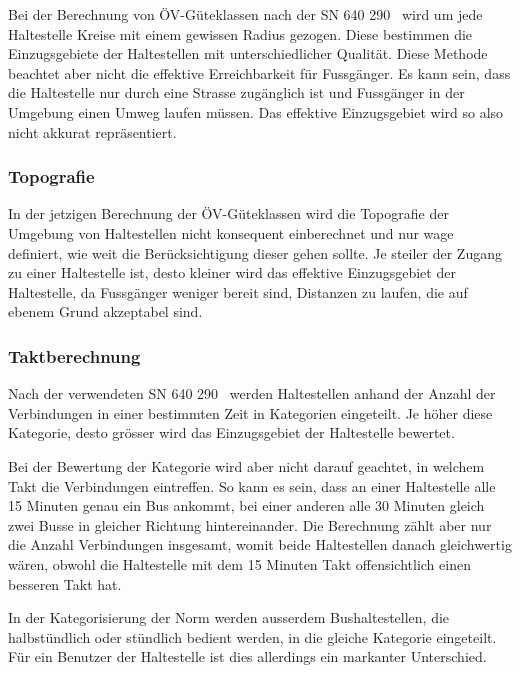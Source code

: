 Bei der Berechnung von \acs{ÖV}-Güteklassen nach der \acs{SN} 640 290~\cite{sn640290} wird um jede Haltestelle Kreise mit einem gewissen Radius gezogen.
Diese bestimmen die Einzugsgebiete der Haltestellen mit unterschiedlicher Qualität.
Diese Methode beachtet aber nicht die effektive Erreichbarkeit für Fussgänger.
Es kann sein, dass die Haltestelle nur durch eine Strasse zugänglich ist und Fussgänger in der Umgebung einen Umweg laufen müssen.
Das effektive Einzugsgebiet wird so also nicht akkurat repräsentiert.

\subsubsection{Topografie}
\label{Problemstellung:Topografie}

In der jetzigen Berechnung der \acs{ÖV}-Güteklassen wird die Topografie der Umgebung von Haltestellen nicht konsequent einberechnet und nur wage definiert, wie weit die Berücksichtigung dieser gehen sollte.
Je steiler der Zugang zu einer Haltestelle ist, desto kleiner wird das effektive Einzugsgebiet der Haltestelle, da Fussgänger weniger bereit sind, Distanzen zu laufen, die auf ebenem Grund akzeptabel sind.

\subsubsection{Taktberechnung}
\label{Problemstellung:Taktberechnung}

Nach der verwendeten \acs{SN} 640 290~\cite{sn640290} werden Haltestellen anhand der Anzahl der Verbindungen in einer bestimmten Zeit in Kategorien eingeteilt.
Je höher diese Kategorie, desto grösser wird das Einzugsgebiet der Haltestelle bewertet.

Bei der Bewertung der Kategorie wird aber nicht darauf geachtet, in welchem Takt die Verbindungen eintreffen.
So kann es sein, dass an einer Haltestelle alle 15 Minuten genau ein Bus ankommt, bei einer anderen alle 30 Minuten gleich zwei Busse in gleicher Richtung hintereinander.
Die Berechnung zählt aber nur die Anzahl Verbindungen insgesamt, womit beide Haltestellen danach gleichwertig wären, obwohl die Haltestelle mit dem 15 Minuten Takt offensichtlich einen besseren Takt hat.

In der Kategorisierung der Norm werden ausserdem Bushaltestellen, die halbstündlich oder stündlich bedient werden, in die gleiche Kategorie eingeteilt.
Für ein Benutzer der Haltestelle ist dies allerdings ein markanter Unterschied.

